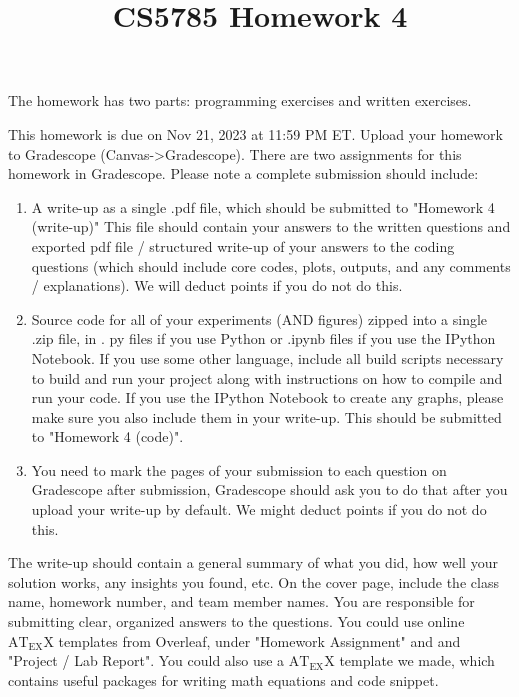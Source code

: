 \documentclass[10pt]{article}
\title{CS5785 Homework 4 }
\author{}
\date{}
\begin{document}
\maketitle
The homework has two parts: programming exercises and written exercises.

This homework is due on Nov 21, 2023 at 11:59 PM ET. Upload your homework to Gradescope (Canvas->Gradescope). There are two assignments for this homework in Gradescope. Please note a complete submission should include:

\begin{enumerate}
  \item A write-up as a single .pdf file, which should be submitted to "Homework 4 (write-up)" This file should contain your answers to the written questions and exported pdf file / structured write-up of your answers to the coding questions (which should include core codes, plots, outputs, and any comments / explanations). We will deduct points if you do not do this.

  \item Source code for all of your experiments (AND figures) zipped into a single .zip file, in . py files if you use Python or .ipynb files if you use the IPython Notebook. If you use some other language, include all build scripts necessary to build and run your project along with instructions on how to compile and run your code. If you use the IPython Notebook to create any graphs, please make sure you also include them in your write-up. This should be submitted to "Homework 4 (code)".

  \item You need to mark the pages of your submission to each question on Gradescope after submission, Gradescope should ask you to do that after you upload your write-up by default. We might deduct points if you do not do this.

\end{enumerate}

The write-up should contain a general summary of what you did, how well your solution works, any insights you found, etc. On the cover page, include the class name, homework number, and team member names. You are responsible for submitting clear, organized answers to the questions. You could use online $\mathrm{AT}_{\mathrm{EX}} \mathrm{X}$ templates from Overleaf, under "Homework Assignment" and and "Project / Lab Report". You could also use a $\mathrm{AT}_{\mathrm{EX}} \mathrm{X}$ template we made, which contains useful packages for writing math equations and code snippet.
\end{document}
